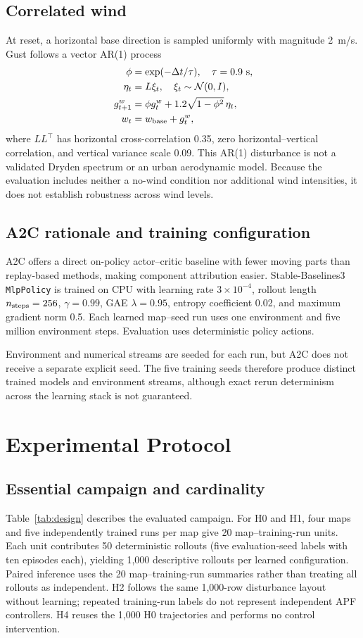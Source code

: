 \documentclass[conference]{IEEEtran}
\begin{document}
\subsection{Correlated wind}
At reset, a horizontal base direction is sampled uniformly with magnitude 2~m/s. Gust follows a vector AR(1) process
\begin{align}
\phi&=\exp(-\Delta t/\tau),\quad \tau=0.9~\mathrm{s},\\
\eta_t&=L\xi_t,\quad \xi_t\sim\mathcal{N}(0,I),\\
g_{t+1}^{w}&=\phi g_t^{w}+1.2\sqrt{1-\phi^2}\,\eta_t,\\
w_t&=w_{\rm base}+g_t^{w},
\end{align}
where $LL^\top$ has horizontal cross-correlation 0.35, zero horizontal--vertical correlation, and vertical variance scale 0.09. This AR(1) disturbance is not a validated Dryden spectrum or an urban aerodynamic model. Because the evaluation includes neither a no-wind condition nor additional wind intensities, it does not establish robustness across wind levels.

\subsection{A2C rationale and training configuration}
A2C offers a direct on-policy actor--critic baseline with fewer moving parts than replay-based methods, making component attribution easier. Stable-Baselines3 \texttt{MlpPolicy} is trained on CPU with learning rate $3\times10^{-4}$, rollout length $n_{\rm steps}=256$, $\gamma=0.99$, GAE $\lambda=0.95$, entropy coefficient 0.02, and maximum gradient norm 0.5. Each learned map--seed run uses one environment and five million environment steps. Evaluation uses deterministic policy actions.

Environment and numerical streams are seeded for each run, but A2C does not receive a separate explicit seed. The five training seeds therefore produce distinct trained models and environment streams, although exact rerun determinism across the learning stack is not guaranteed.

\section{Experimental Protocol}\label{sec:protocol}
\subsection{Essential campaign and cardinality}
Table~\ref{tab:design} describes the evaluated campaign. For H0 and H1, four maps and five independently trained runs per map give 20 map--training-run units. Each unit contributes 50 deterministic rollouts (five evaluation-seed labels with ten episodes each), yielding 1,000 descriptive rollouts per learned configuration. Paired inference uses the 20 map--training-run summaries rather than treating all rollouts as independent. H2 follows the same 1,000-row disturbance layout without learning; repeated training-run labels do not represent independent APF controllers. H4 reuses the 1,000 H0 trajectories and performs no control intervention.
\end{document}
